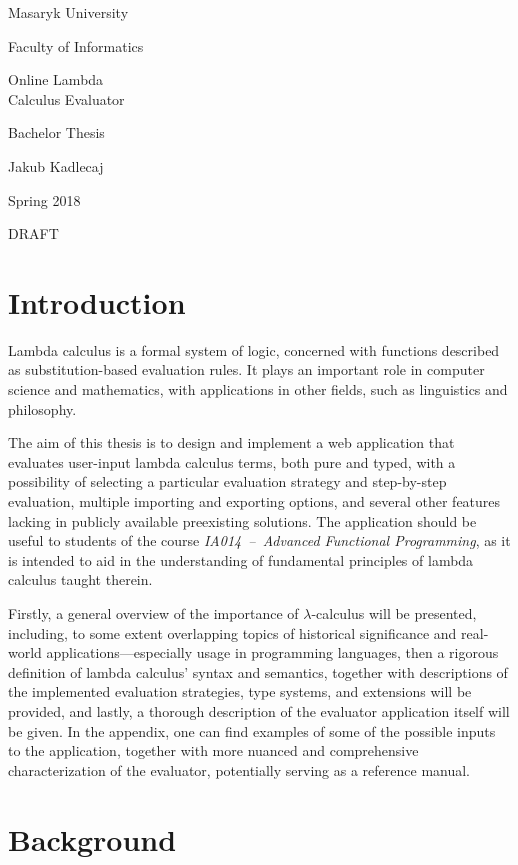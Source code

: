 \documentclass[a4paper,10pt]{article}
\begin{document}
Masaryk University

Faculty of Informatics

{\Huge 
Online Lambda\\Calculus Evaluator
}

Bachelor Thesis

Jakub Kadlecaj

Spring 2018

DRAFT

\newpage
\tableofcontents
\newpage

\section{Introduction}

Lambda calculus is a formal system of logic, concerned with functions described as
substitution-based evaluation rules. It plays an important role in computer science
and mathematics, with applications in other fields, such as linguistics 
and philosophy.

The aim of this thesis is to design and implement a web application that evaluates
user-input lambda calculus terms, both pure and typed, with a possibility of
selecting a particular evaluation strategy and step-by-step evaluation, 
multiple importing and exporting options, and several other features lacking 
in publicly available preexisting solutions. The application should be useful to students of
the course \textit{IA014~--~Advanced Functional Programming}, as it is intended to aid in the understanding
of fundamental principles of lambda calculus taught therein.

Firstly, a general overview of the importance of $\lambda$-calculus will be presented,
including, to some extent overlapping topics of historical significance 
and real-world applications---especially usage in
programming languages, then a rigorous definition of lambda calculus' syntax and semantics, together with
descriptions of the implemented evaluation strategies, type systems, and extensions will be provided,
and lastly, a thorough description of the evaluator application itself will be given. In the appendix,
one can find examples of some of the possible inputs to the application, together with more
nuanced and comprehensive characterization of the evaluator, potentially serving as a reference manual.
\newpage

\section{Background}
\end{document}
